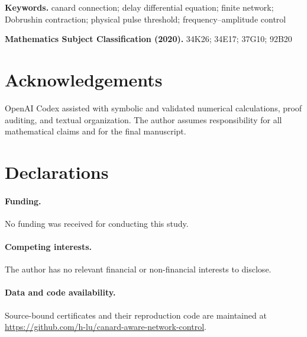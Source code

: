 \documentclass[11pt]{article}
\begin{document}
\noindent\textbf{Keywords.}
canard connection; delay differential equation; finite network;
Dobrushin contraction; physical pulse threshold; frequency--amplitude control

\medskip
\noindent\textbf{Mathematics Subject Classification (2020).}
34K26; 34E17; 37G10; 92B20







\section*{Acknowledgements}
OpenAI Codex assisted with symbolic and validated numerical calculations,
proof auditing, and textual organization.  The author assumes responsibility
for all mathematical claims and for the final manuscript.

\section*{Declarations}
\paragraph{Funding.} No funding was received for conducting this study.
\paragraph{Competing interests.} The author has no relevant financial or
non-financial interests to disclose.
\paragraph{Data and code availability.} Source-bound certificates and their
reproduction code are maintained at
\url{https://github.com/h-lu/canard-aware-network-control}.

\begingroup
\small


\endgroup
\end{document}
